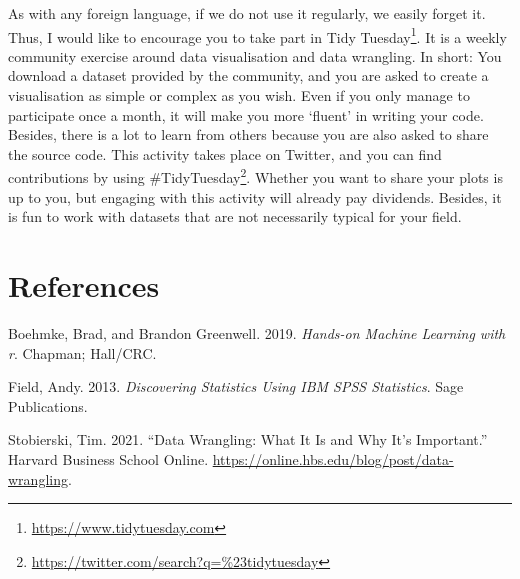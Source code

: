 \documentclass[
  letterpaper,
]{krantz}
\newlength{\cslhangindent}
\newenvironment{CSLReferences}[2] %
 {\begin{list}{}{%
  \setlength{\itemindent}{0pt}
  \setlength{\leftmargin}{0pt}
  \setlength{\parsep}{0pt}
  \ifodd #1
   \setlength{\leftmargin}{\cslhangindent}
   \setlength{\itemindent}{-1\cslhangindent}
  \fi
  \setlength{\itemsep}{#2\baselineskip}}}
 {\end{list}}
\renewcommand{\href}[2]{#2\footnote{\url{#1}}}
\begin{document}
As with any foreign language, if we do not use it regularly, we easily
forget it. Thus, I would like to encourage you to take part in
\href{https://www.tidytuesday.com}{Tidy Tuesday}. It is a weekly
community exercise around data visualisation and data wrangling. In
short: You download a dataset provided by the community, and you are
asked to create a visualisation as simple or complex as you wish. Even
if you only manage to participate once a month, it will make you more
`fluent' in writing your code. Besides, there is a lot to learn from
others because you are also asked to share the source code. This
activity takes place on Twitter, and you can find contributions by using
\href{https://twitter.com/search?q=\%23tidytuesday}{\#TidyTuesday}.
Whether you want to share your plots is up to you, but engaging with
this activity will already pay dividends. Besides, it is fun to work
with datasets that are not necessarily typical for your field.


\chapter*{References}\label{references}


\label{refs}
\begin{CSLReferences}{1}{0}
Boehmke, Brad, and Brandon Greenwell. 2019. \emph{Hands-on Machine
Learning with r}. Chapman; Hall/CRC.

Field, Andy. 2013. \emph{Discovering Statistics Using IBM SPSS
Statistics}. Sage Publications.

Stobierski, Tim. 2021. {``Data Wrangling: What It Is and Why It's
Important.''} Harvard Business School Online.
\url{https://online.hbs.edu/blog/post/data-wrangling}.

\end{CSLReferences}



\backmatter
\printindex
\end{document}
